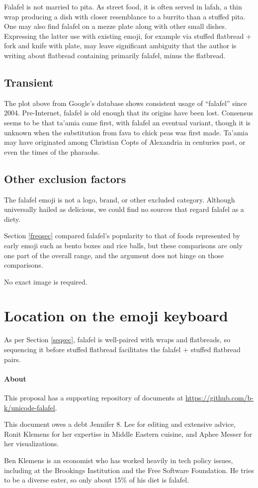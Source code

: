 \documentclass[a4paper,10pt]{article}
\begin{document}
Falafel is not married to pita. As street food, it is often served in lafah,
a thin wrap producing a dish with closer resemblance to a burrito than a
stuffed pita. One may also find falafel on a mezze plate along with other small
dishes. Expressing the latter use with existing emoji, for example via {\sc stuffed
flatbread + fork and knife with plate}, may leave significant ambiguity that the author
is writing about flatbread containing primarily falafel, minus the flatbread.

\subsection{Transient}

The plot above from Google's database shows consistent usage of ``falafel'' 
since 2004. Pre-Internet, falafel is old enough that its
origins have been lost. Consensus seems to be that ta'amia came first, with falafel an
eventual variant, though it is unknown when the substitution from fava to chick peas
was first made.  Ta'amia may have originated among Christian Copts of Alexandria in
centuries past, or even the times of the pharaohs.

\subsection{Other exclusion factors}
The {\sc falafel} emoji is not a logo, brand, or other excluded category. Although
universally hailed as delicious, we could find no sources that regard falafel as a diety.

Section \ref{freqsec} compared falafel's popularity to that of foods represented by early
emoji such as bento boxes and rice balls, but these comparisons are only one part of the
overall range, and the argument does not hinge on those comparisons.

No exact image is required.

\section{Location on the emoji keyboard}

As per Section \ref{seqsec}, falafel is well-paired with wraps and flatbreads, so 
sequencing it before {\sc stuffed flatbread}
facilitates the {\sc falafel} + {\sc stuffed flatbread} pairs.

\vfill
{\small \paragraph{About}
This proposal has a supporting repository of documents at 
\url{https://github.com/b-k/unicode-falafel}.

This document owes a debt Jennifer 8. Lee for editing and extensive
advice, Ronit Klemens for her expertise in Middle Eastern cuisine,
and Aphee Messer for her visualizations.

Ben Klemens is an economist who has worked heavily in tech policy issues, including at
the Brookings Institution and the Free Software Foundation. He tries to be a diverse
eater, so only about 15\% of his diet is falafel.
}
\end{document}
